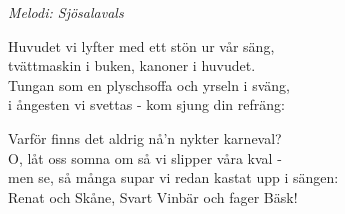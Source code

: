 {\footnotesize\textit{Melodi: Sjösalavals}}\par
\vspace{10pt}
Huvudet vi lyfter med ett stön ur vår säng,\\
tvättmaskin i buken, kanoner i huvudet.\\
Tungan som en plyschsoffa och yrseln i sväng,\\
i ångesten vi svettas - kom sjung din refräng:\par
\vspace{10pt}
Varför finns det aldrig nå'n nykter karneval?\\
O, låt oss somna om så vi slipper våra kval -\\
men se, så många supar vi redan kastat upp i sängen:\\
Renat och Skåne, Svart Vinbär och fager Bäsk!
